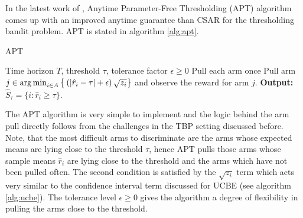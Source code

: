 In the latest work of \citet{locatelli2016optimal}, Anytime Parameter-Free Thresholding (APT) algorithm comes up with an improved anytime guarantee than CSAR for the thresholding bandit problem. APT is stated in algorithm \ref{alg:apt}. 

\begin{algorithm}[!th]
\caption{APT}
\label{alg:apt}
\begin{algorithmic}
 Time horizon $T$, threshold $\tau$, tolerance factor $\epsilon\geq 0$
\State Pull each arm once
\State {}
\State Pull arm $j\in\operatorname*{arg\,min}_{i\in A}\big\lbrace \left(|\hat{r}_{i} - \tau | + \epsilon\right)\sqrt{z_i}\big\rbrace$ and observe the reward for arm $j$.
\EndFor
\State \textbf{Output:} $\hat{S}_{\tau}=\lbrace i: \hat{r}_{i}\geq \tau \rbrace$.
\end{algorithmic}
\end{algorithm}

The APT algorithm is very simple to implement and the logic behind the arm pull directly follows from the challenges in the TBP setting discussed before. Note, that the most difficult arms to discriminate are the arms whose expected means are lying close to the threshold $\tau$, hence APT pulls those arms whose sample means $\hat{r}_i$ are lying close to the threshold and the arms which have not been pulled often. The second condition is satisfied by the $\sqrt{z_i}$ term which acts very similar to the confidence interval term discussed for UCBE (see algorithm \ref{alg:ucbe}). The tolerance level $\epsilon\geq 0$ gives the algorithm a degree of flexibility in pulling the arms close to the threshold.